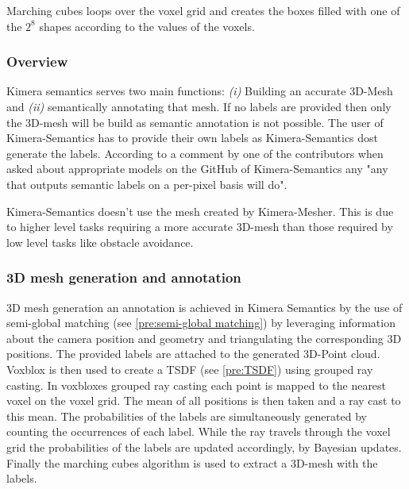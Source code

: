 \documentclass[11pt,a4paper]{article}
\begin{document}
Marching cubes loops over the voxel grid and creates the boxes filled with one of the $2^8$ shapes according to the values of the voxels.

\subsubsection{Overview}
Kimera semantics serves two main functions: \textit{(i)} Building an accurate 3D-Mesh and  \textit{(ii)} semantically annotating that mesh.
If no labels are provided then only the 3D-mesh will be build as semantic annotation is not possible.
The user of Kimera-Semantics has to provide their own labels as Kimera-Semantics dost generate the labels. 
According to a comment by one of the contributors when asked about appropriate models on the GitHub of Kimera-Semantics any "any that outputs semantic labels on a per-pixel basis will do".

Kimera-Semantics doesn't use the mesh created by Kimera-Mesher. 
This is due to higher level tasks requiring a more accurate 3D-mesh than those required by low level tasks like obstacle avoidance.
\subsubsection*{3D mesh generation and annotation}
3D mesh generation an annotation is achieved in Kimera Semantics by the use of semi-global matching (see \ref{pre:semi-global matching}) by leveraging information about the camera position and geometry and triangulating the corresponding 3D positions.
The provided labels are attached to the generated 3D-Point cloud. 
Voxblox is then used to create a TSDF (see \ref{pre:TSDF}) using grouped ray casting.
In voxbloxes grouped ray casting each point is mapped to the nearest voxel on the voxel grid. 
The mean of all positions is then taken and a ray cast to this mean. 
The probabilities of the labels are simultaneously generated by counting the occurrences of each label. 
While the ray travels through the voxel grid the probabilities of the labels are updated accordingly, by Bayesian updates. 
Finally the marching cubes algorithm is used to extract a 3D-mesh with the labels.
\end{document}
